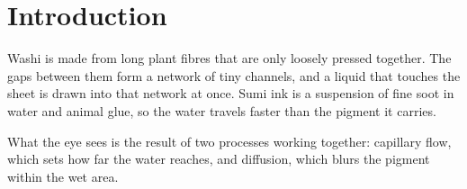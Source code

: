 \section{Introduction}

Washi is made from long plant fibres that are only loosely
pressed together. The gaps between them form a network of
tiny channels, and a liquid that touches the sheet is
drawn into that network at once. Sumi ink is a suspension
of fine soot in water and animal glue, so the water
travels faster than the pigment it carries.

What the eye sees is the result of two processes working
together: capillary flow, which sets how far the water
reaches, and diffusion, which blurs the pigment within the
wet area.
